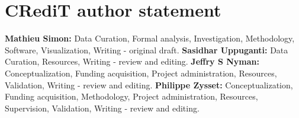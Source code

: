 \documentclass[a4paper,fleqn]{DC_ArtStyle}
\begin{document}
	\section*{CRediT author statement}
	\textbf{Mathieu Simon:} Data Curation, Formal analysis, Investigation, Methodology, Software, Visualization, Writing - original draft.
	\textbf{Sasidhar Uppuganti:} Data Curation, Resources, Writing - review and editing.
	\textbf{Jeffry S Nyman:} Conceptualization, Funding acquisition, Project administration, Resources, Validation, Writing - review and editing.
	\textbf{Philippe Zysset:} Conceptualization, Funding acquisition, Methodology, Project administration, Resources, Supervision, Validation, Writing - review and editing.

	\nocite{*}
	
	


	


	\clearpage
	\appendix
	
	
	
\end{document}

